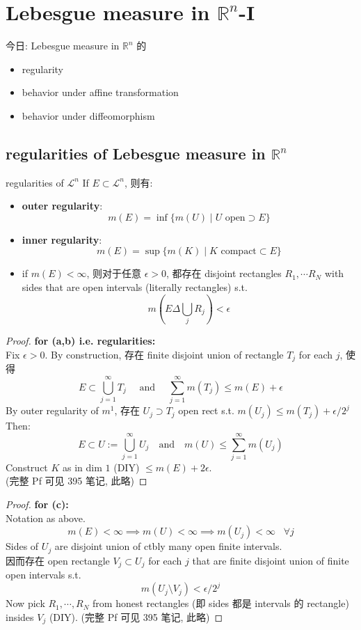 \documentclass[lang=cn,11pt]{elegantbook}
\begin{document}
\chapter{Lebesgue measure in $\mathbb{R}^n$-I}
今日: Lebesgue measure in $\mathbb{R}^n$ 的 \begin{itemize}
    \item regularity
    \item behavior under affine transformation
    \item behavior under diffeomorphism
\end{itemize}

\section{regularities of Lebesgue measure in $\mathbb{R}^n$ }

\begin{theorem}{regularities of $\mathcal{L}^n$}
If $E \subset \mathcal{L}^n$, 则有: 
\begin{itemize}
    \item \textbf{outer regularity}: \[ m(E) = \inf \{  m(U) \mid U  \text{ open}   \supset E\}  \]
    \item \textbf{inner regularity}: \[ m(E) = \sup \{  m(K) \mid K  \text{ compact}   \subset E\}  \]
    \item if $m(E) < \infty$, 则对于任意 $\epsilon > 0$, 都存在 disjoint rectangles $R_1, \cdots R_N$ with sides that are open intervals (literally rectangles) s.t. \[ m(E  \Delta \bigcup_{j} R_j ) < \epsilon \]
\end{itemize}
\end{theorem}
\begin{proof}
 \textbf{   for (a,b) i.e. regularities: }\\
 Fix $\epsilon > 0 $. By construction, 存在 finite disjoint union of rectangle $T_j$ for each $j$, 使得 \[
 E \subset \bigcup_{j=1}^\infty T_j \quad \text{ and } \quad \sum_{j=1}^\infty m(T_j) \leq m(E) + \epsilon
 \]
By outer regularity of $m^1$, 存在 $U_j \supset T_j$ open rect s.t. $m(U_j) \leq m(T_j) + \epsilon / 2^j$
Then: \[
E \subset U := \bigcup_{j=1}^\infty U_j \quad \text{and} \quad m(U) \leq \sum_{j=1}^\infty m(U_j)
\]
Construct $K$ as in dim $1$ (DIY) $\leq m(E) + 2\epsilon$.\\
(完整 Pf 可见 395 笔记, 此略)
\end{proof}
\begin{proof}
 \textbf{   for (c):} \\
Notation as above.\\
\[
m(E) < \infty \implies m(U) < \infty \implies m(U_j)  < \infty \;\; \; \forall j
\]
Sides of $U_j$ are disjoint union of ctbly many open finite intervals.\\
因而存在 open rectangle $V_j \subset U_j$ for each $j$ that are finite disjoint union of finite open intervals s.t. \[
m(U_j  \setminus   V_j) < \epsilon / 2^j
\]
Now pick $R_1, \cdots, R_N$ from honest rectangles (即 sides 都是 intervals 的 rectangle) insides $V_j$ (DIY).
(完整 Pf 可见 395 笔记, 此略)
\end{proof}
\end{document}
